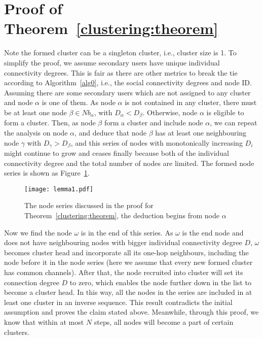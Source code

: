 \documentclass[10pt,journal,compsoc]{IEEEtran}
\makeatletter
\theoremstyle{mytheoremstyle}
\theoremstyle{mytheoremstyle}
\theoremstyle{mytheoremstyle}
\renewenvironment{proof}[1][\proofname]{%
      \par\pushQED{\qed}\fontfamily{ptm}\selectfont%
      \topsep6\p@\@plus6\p@\relax
      \trivlist\item[\hskip\labelsep\bfseries#1\@addpunct{.}]%
      \ignorespaces
    }{%
      \popQED\endtrivlist\@endpefalse
    }
\newcommand{\ie}{i.e., }
\makeatother
\begin{document}
\section*{Proof of Theorem~\ref{clustering:theorem}}
\label{proof_clustering:theorem}
\begin{proof}
Note the formed cluster can be a singleton cluster, \ie cluster size is 1.
To simplify the proof, we assume secondary users have unique individual connectivity degrees.
This is fair as there are other metrics to break the tie according to Algorithm~\ref{alg0}, \ie the social connectivity degrees and node ID.
Assuming there are some secondary users which are not assigned to any cluster and node $\alpha$ is one of them.
As node $\alpha$ is not contained in any cluster, there must be at least one node $\beta\in Nb_\alpha$, with $D_{\alpha} < D_{\beta}$.
Otherwise, node $\alpha$ is eligible to form a cluster.
Then, as node $\beta$ form a cluster and include node $\alpha$, we can repeat the analysis on node $\alpha$, and deduce that node $\beta$ has at least one neighbouring node $\gamma$ with $D_{\gamma}>D_{\beta}$, and this series of nodes with monotonically increasing $D_i$ might continue to grow and ceases finally because both of the individual connectivity degree 
and the total number of nodes are limited.
The formed node series is shown as Figure~\ref{lemma1}.

\begin{figure}[ht!]
  \centering
\texttt{[image: lemma1.pdf]}
	\caption{The node series discussed in the proof for Theorem~\ref{clustering:theorem}, the deduction begins from node $\alpha$}
	\label{lemma1}
\end{figure}


Now we find the node $\omega$ is in the end of this series.
As $\omega$ is the end node and does not have neighbouring nodes with bigger individual connectivity degree $D$, $\omega$ becomes cluster head and incorporate all its one-hop neighbours, including the node before it in the node series (here we assume that every new formed cluster has common channels).
After that, the node recruited into cluster will set its connection degree $D$ to zero, which enables the node further down in the list to become a cluster head.
In this way, all the nodes in the series are included in at least one cluster in an inverse sequence.
This result contradicts the initial assumption and proves the claim stated above.
Meanwhile, through this proof, we know that within at most $N$ steps, all nodes will become a part of certain clusters.
\end{proof}
\end{document}
